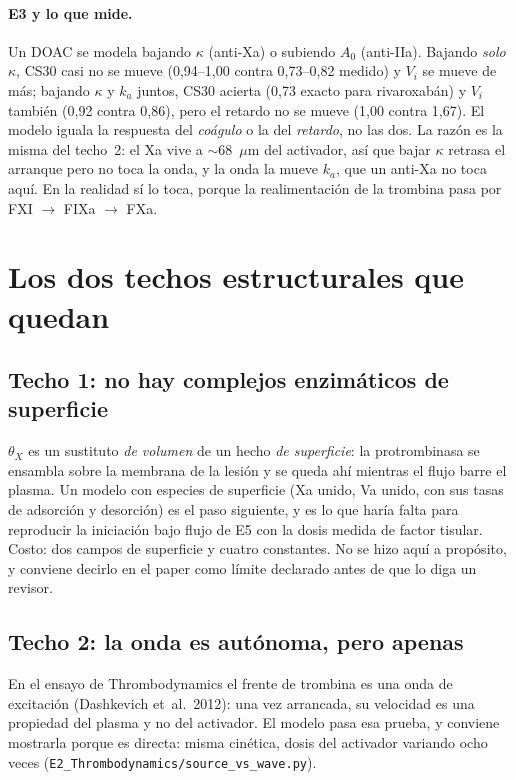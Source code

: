 \documentclass[11pt,a4paper]{article}
\begin{document}
\paragraph{E3 y lo que mide.} Un DOAC se modela bajando $\kappa$ (anti-Xa) o
subiendo $A_0$ (anti-IIa). Bajando \emph{solo} $\kappa$, CS30 casi no se mueve
(0{,}94--1{,}00 contra 0{,}73--0{,}82 medido) y $V_i$ se mueve de más; bajando
$\kappa$ y $k_a$ juntos, CS30 acierta (0{,}73 exacto para rivaroxabán) y $V_i$
también (0{,}92 contra 0{,}86), pero el retardo no se mueve (1{,}00 contra
1{,}67). El modelo iguala la respuesta del \emph{coágulo} o la del \emph{retardo},
no las dos. La razón es la misma del techo~2: el Xa vive a $\sim$68~$\mu$m del
activador, así que bajar $\kappa$ retrasa el arranque pero no toca la onda, y la
onda la mueve $k_a$, que un anti-Xa no toca aquí. En la realidad sí lo toca,
porque la realimentación de la trombina pasa por FXI $\to$ FIXa $\to$ FXa.

\section{Los dos techos estructurales que quedan}

\subsection{Techo 1: no hay complejos enzimáticos de superficie}

$\theta_X$ es un sustituto \emph{de volumen} de un hecho \emph{de superficie}: la
protrombinasa se ensambla sobre la membrana de la lesión y se queda ahí mientras el
flujo barre el plasma. Un modelo con especies de superficie (Xa unido, Va unido, con
sus tasas de adsorción y desorción) es el paso siguiente, y es lo que haría falta
para reproducir la iniciación bajo flujo de E5 con la dosis medida de factor
tisular. Costo: dos campos de superficie y cuatro constantes. No se hizo aquí a
propósito, y conviene decirlo en el paper como límite declarado antes de que lo diga
un revisor.

\subsection{Techo 2: la onda es autónoma, pero apenas}

En el ensayo de Thrombodynamics el frente de trombina es una onda de excitación
(Dashkevich et~al.~2012): una vez arrancada, su velocidad es una propiedad del
plasma y no del activador. El modelo pasa esa prueba, y conviene mostrarla porque
es directa: misma cinética, dosis del activador variando ocho veces
(\texttt{E2\_Thrombodynamics/source\_vs\_wave.py}).
\end{document}

